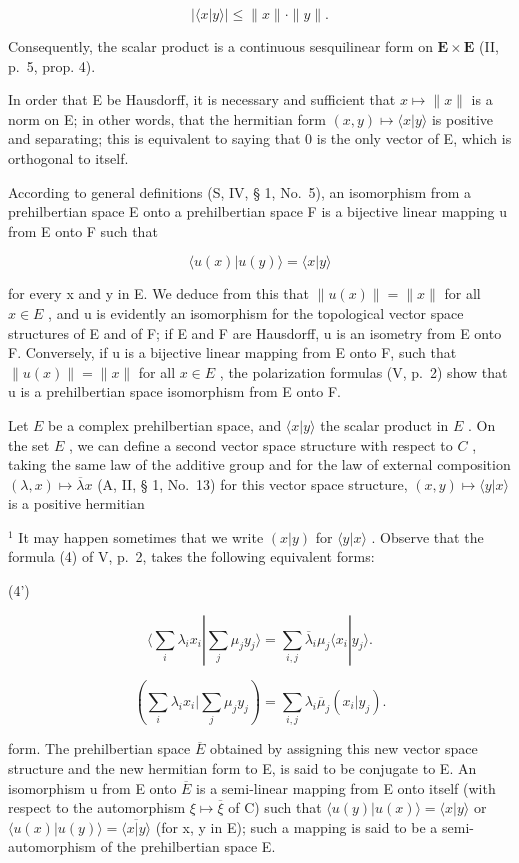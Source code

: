 \[
\left| \langle x | y \rangle \right| \leqslant \| x \|\cdot \| y \|.\tag{9}
\]

Consequently, the scalar product is a continuous sesquilinear form on \(\mathbf{E} \times \mathbf{E}\) (II, p.~5, prop. 4).

In order that E be Hausdorff, it is necessary and sufficient that \(x \mapsto \|x\|\) is a norm on E; in other words, that the hermitian form \((x, y) \mapsto \langle x | y \rangle\) is positive and separating; this is equivalent to saying that 0 is the only vector of E, which is orthogonal to itself.

According to general definitions (S, IV, § 1, No.~5), an isomorphism from a prehilbertian space E onto a prehilbertian space F is a bijective linear mapping u from E onto F such that

\[
\langle u (x) | u (y) \rangle = \langle x | y \rangle\tag{10}
\]

for every x and y in E. We deduce from this that \(\|u(x)\| = \|x\|\) for all \(x \in E\) , and u is evidently an isomorphism for the topological vector space structures of E and of F; if E and F are Hausdorff, u is an isometry from E onto F. Conversely, if u is a bijective linear mapping from E onto F, such that \(\|u(x)\| = \|x\|\) for all \(x \in E\) , the polarization formulas (V, p.~2) show that u is a prehilbertian space isomorphism from E onto F.

Let \(E\) be a complex prehilbertian space, and \(\langle x|y\rangle\) the scalar product in \(E\) . On the set \(E\) , we can define a second vector space structure with respect to \(C\) , taking the same law of the additive group and for the law of external composition \((\lambda, x) \mapsto \overline{\lambda}x\) (A, II, § 1, No.~13) for this vector space structure, \((x, y) \mapsto \langle y|x\rangle\) is a positive hermitian

\(^{1}\) It may happen sometimes that we write \((x|y)\) for \(\langle y|x\rangle\) . Observe that the formula (4) of V, p.~2, takes the following equivalent forms:

(4')

\[
\langle \sum_ {i} \lambda_ {i} x _ {i} | \sum_ {j} \mu_ {j} y _ {j} \rangle = \sum_ {i, j} \overline {{{{\lambda}}}} _ {i} \mu_ {j} \langle x _ {i} | y _ {j} \rangle .\tag{4"}
\]

\[
(\sum_ {i} \lambda_ {i} x _ {i} | \sum_ {j} \mu_ {j} y _ {j}) = \sum_ {i, j} \lambda_ {i} \overline {{\mu}} _ {j} (x _ {i} | y _ {j}).
\]

form. The prehilbertian space \(\overline{E}\) obtained by assigning this new vector space structure and the new hermitian form to E, is said to be conjugate to E. An isomorphism u from E onto \(\overline{E}\) is a semi-linear mapping from E onto itself (with respect to the automorphism \(\xi \mapsto \overline{\xi}\) of C) such that \(\langle u(y)|u(x)\rangle = \langle x|y\rangle\) or \(\langle u(x)|u(y)\rangle = \overline{\langle x|y\rangle}\) (for x, y in E); such a mapping is said to be a semi-automorphism of the prehilbertian space E.

